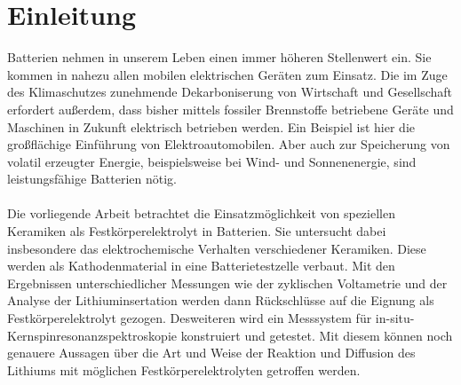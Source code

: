 \documentclass[a4paper, 11pt, headsepline,footsepline,twoside,abstract]{scrbook}
\begin{document}
\chapter{Einleitung}
Batterien nehmen in unserem Leben einen immer höheren Stellenwert ein. Sie kommen in nahezu allen mobilen elektrischen Geräten zum Einsatz. Die im Zuge des Klimaschutzes zunehmende Dekarboniserung von Wirtschaft und Gesellschaft erfordert außerdem, dass bisher mittels fossiler Brennstoffe betriebene Geräte und Maschinen in Zukunft elektrisch betrieben werden. Ein Beispiel ist hier die großflächige Einführung von Elektroautomobilen. Aber auch zur Speicherung von volatil erzeugter Energie, beispielsweise bei Wind- und Sonnenenergie, sind leistungsfähige Batterien nötig.
\\\\
%
Die vorliegende Arbeit betrachtet die Einsatzmöglichkeit von speziellen Keramiken als Festkörperelektrolyt in Batterien. Sie untersucht dabei insbesondere das elektrochemische Verhalten verschiedener Keramiken. Diese werden als Kathodenmaterial in eine Batterietestzelle verbaut. Mit den Ergebnissen unterschiedlicher Messungen wie der zyklischen Voltametrie und der Analyse der Lithiuminsertation werden dann Rückschlüsse auf die Eignung als Festkörperelektrolyt gezogen. Desweiteren wird ein Messsystem für in-situ-Kernspinresonanzspektroskopie konstruiert und getestet. Mit diesem können noch genauere Aussagen über die Art und Weise der Reaktion und Diffusion des Lithiums mit möglichen Festkörperelektrolyten getroffen werden.
\end{document}
